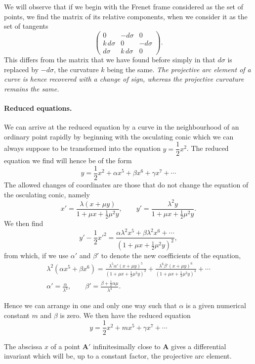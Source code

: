 We will observe that if we begin with the Frenet frame considered as the set of points, we find the matrix of its relative components, when we consider it as the set of tangents
\[
\begin{pmatrix}
  0&-d\sigma&0\\
  k\,d\sigma&0&-d\sigma\\
  d\sigma&k\,d\sigma&0
\end{pmatrix}.
\]
This differs from the matrix that we have found before simply in that $d\sigma$ is replaced by $-d\sigma$, the curvature $k$ being the same. \emph{The projective arc element of a curve is hence recovered with a change of sign, whereas the projective curvature remains the same.}


\paragraph{Reduced equations.}
\label{sec:151}
We can arrive at the reduced equation by a curve in the neighbourhood of an ordinary point rapidly by beginning with the osculating conic which we can always suppose to be transformed into the equation $y=\dfrac{1}{2}x^{2}$. The reduced equation we find will hence be of the form
\[
y=\frac{1}{2}x^{2}+\alpha x^{5}+\beta x^{6}+\gamma x^{7}+\cdots
\]
The allowed changes of coordinates are those that do not change the equation of the osculating conic, namely
\[
x'=\frac{\lambda(x+\mu y)}{1+\mu x+\frac{1}{2}\mu^{2}y},\qquad y'=\frac{\lambda^{2}y}{1+\mu x+\frac{1}{2}\mu^{2}y}.
\]
We then find
\[
y'-\frac{1}{2}x'^{2}=\frac{\alpha\lambda^{2}x^{5}+\beta\lambda^{2}x^{6}+\cdots}{(1+\mu x+\frac{1}{2}\mu^{2}y)^{2}},
\]
from which, if we use $\alpha'$ and $\beta'$ to denote the new coefficients of the equation,
\begin{gather*}
  \lambda^{2}(\alpha x^{5}+\beta x^{6})=
  \frac{\lambda^{5}\alpha'(x+\mu y)^{5}}{(1+\mu x+\frac{1}{2}\mu^{2}y)^{3}}+
  \frac{\lambda^{6}\beta'(x+\mu y)^{6}}{(1+\mu x+\frac{1}{2}\mu^{2}y)^{4}}+\cdots
  \\
  \alpha'=\frac{\alpha}{\lambda^{3}},\qquad\beta'=\frac{\beta+\frac{1}{2}\alpha\mu}{\lambda^{4}}.
\end{gather*}

Hence we can arrange in one and only one way such that $\alpha$ is a given numerical constant $m$ and $\beta$ is zero. We then have the reduced equation
\[
y=\frac{1}{2}x^{2}+m x^{5}+\gamma x^{7}+\cdots
\]

The abscissa $x$ of a point $\mathbf{A}'$ infinitesimally close to $\mathbf{A}$ gives a differential invariant which will be, up to a constant factor, the projective arc element.

